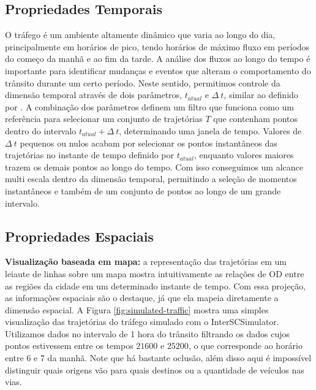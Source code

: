 \subsection{Propriedades Temporais}
O tráfego é um ambiente altamente dinâmico que varia ao longo do
dia, principalmente em horários de pico, tendo horários de máximo fluxo em
períodos do começo da manhã e ao fim da tarde. A análise dos fluxos ao
longo do tempo é importante para identificar mudanças e eventos que alteram o
comportamento do trânsito durante um certo período. Neste sentido, permitimos
controle da dimensão temporal através de dois parâmetros, $t_{atual}$ e
$\Delta~t$, similar ao definido por \citet{Klein2013}. A combinação dos
parâmetros definem um filtro que funciona como um referência para selecionar um
conjunto de trajetórias  ${T}$ que contenham pontos dentro do intervalo
$t_{atual} + \Delta~t$, determinando uma janela de tempo. Valores de $\Delta~t$
pequenos ou nulos acabam por selecionar os pontos instantâneos das trajetórias
no instante de tempo definido por $t_{atual}$, enquanto valores maiores trazem
os demais pontos ao longo do tempo. Com isso conseguimos um alcance multi
escala dentro da dimensão temporal, permitindo a seleção de momentos
instantâneos e também de um conjunto de pontos ao longo de um grande intervalo.

\subsection{Propriedades Espaciais}

\textbf{Visualização baseada em mapa:} a representação das trajetórias em um
leiaute de linhas sobre um mapa mostra intuitivamente as relações de OD entre
as regiões da cidade em um determinado instante de tempo. Com essa projeção, as
informações espaciais são o destaque, já que ela mapeia diretamente a dimensão
espacial. A Figura \ref{fig:simulated-traffic} mostra uma simples visualização das
trajetórias do tráfego simulado com o InterSCSimulator. Utilizamos dados no
intervalo de 1 hora do trânsito filtrando os dados cujos pontos estivessem
entre os tempos $21600$ e $25200$, o que corresponde ao horário entre 6 e 7 da
manhã. Note que há bastante oclusão, além disso aqui é impossível distinguir
quais origens vão para quais destinos ou a quantidade de veículos nas vias.

